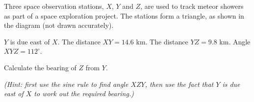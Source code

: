 \begin{question}
\noindent Three space observation stations, $X$, $Y$ and $Z$, are used to track meteor showers as part of a space exploration project. The stations form a triangle, as shown in the diagram (not drawn accurately).

$Y$ is due east of $X$.
The distance $XY = 14.6$ km.
The distance $YZ = 9.8$ km.
Angle $XYZ = 112^{\circ}$.

\begin{center}
\end{center}

\noindent Calculate the bearing of $Z$ from $Y$.

\vspace{0.3cm}
\noindent \textit{(Hint: first use the sine rule to find angle $XZY$, then use the fact that $Y$ is due east of $X$ to work out the required bearing.)}

\vspace{5cm}
\begin{flushright}
\end{flushright}
\end{question}
